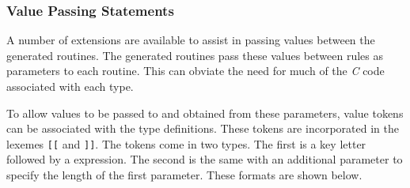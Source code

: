 \subsubsection	{Value Passing Statements}
A number of extensions are available to assist in passing values
between the generated routines.
The generated routines pass these values between rules as
parameters to each routine. This can obviate the need for
much of the {\em C\/} code associated with each type.

To allow values to be passed to and obtained from these parameters,
value tokens can be associated with the type definitions. These tokens
are incorporated in the lexemes \verb"[[" and \verb"]]".
The tokens come in two types. The first is a key letter followed
by a expression. The second is the same with an additional parameter
to specify the length of the first parameter. These formats are shown
below.
